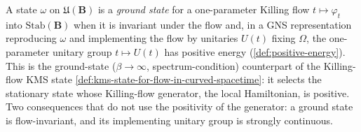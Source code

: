 \begin{definition}
    \label{def:ground-state-for-flow-in-curved-spacetime}
    \leanok
    A state $\omega$ on $\mathfrak{U}(\mathbf{B})$ is a \emph{ground state} for a one-parameter Killing flow $t \mapsto \varphi_t$ into $\mathrm{Stab}(\mathbf{B})$ when it is invariant under the flow and, in a GNS representation reproducing $\omega$ and implementing the flow by unitaries $U(t)$ fixing $\Omega$, the one-parameter unitary group $t \mapsto U(t)$ has positive energy (\ref{def:positive-energy}). This is the ground-state ($\beta \to \infty$, spectrum-condition) counterpart of the Killing-flow KMS state \ref{def:kms-state-for-flow-in-curved-spacetime}: it selects the stationary state whose Killing-flow generator, the local Hamiltonian, is positive. Two consequences that do not use the positivity of the generator: a ground state is flow-invariant, and its implementing unitary group is strongly continuous.
\end{definition}
